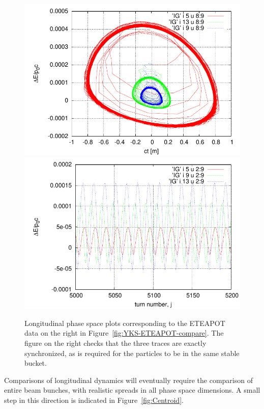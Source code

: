 \documentclass[12]{article}
\begin{document}
\begin{figure}[h]
\centering
\includegraphics[scale=0.6]{CheckYKS-Fig18-longit.pdf}
\includegraphics[scale=0.6]{CheckYKS-synchronized-q.pdf}
\caption{\label{fig:RK-compare-longit}Longitudinal phase 
space plots corresponding to the ETEAPOT data on the 
right in Figure~\ref{fig:YKS-ETEAPOT-compare}. The figure
on the right checks that the three traces are exactly
synchronized, as is required for the particles to be in
the same stable bucket.}
\end{figure}

Comparisons of longitudinal dynamics will eventually require
the comparison of entire beam bunches, with realistic spreads
in all phase space dimensions. A small step in this direction
is indicated in Figure~\ref{fig:Centroid}. 
\end{document}
